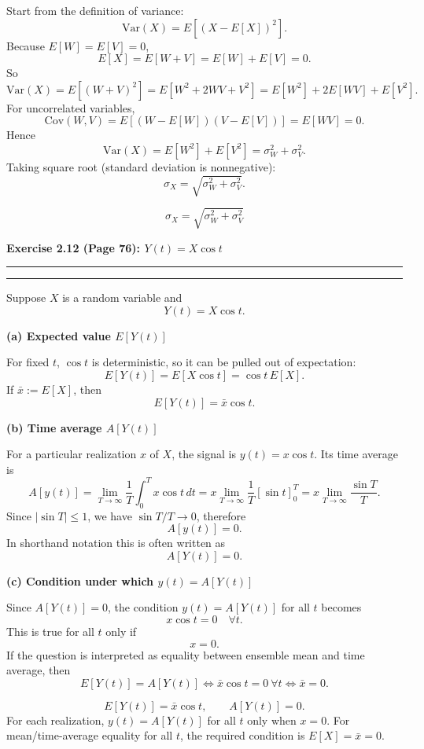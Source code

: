 \documentclass[12pt]{article}
\newcommand{\question}[1]{%
  \clearpage
  \vspace{0.5cm}
  {\noindent\normalsize \textbf{#1}}
  \vspace{0.2cm}
  \hrule
  \vspace{0.1cm}
  \hrule
  \vspace{0.3cm}
}
\begin{document}
\begin{stepbox}
Start from the definition of variance:
\[
\mathrm{Var}(X)=E[(X-E[X])^2].
\]
Because $E[W]=E[V]=0$,
\[
E[X]=E[W+V]=E[W]+E[V]=0.
\]
So
\[
\mathrm{Var}(X)=E[(W+V)^2]
=E[W^2+2WV+V^2]
=E[W^2]+2E[WV]+E[V^2].
\]
For uncorrelated variables,
\[
\mathrm{Cov}(W,V)=E[(W-E[W])(V-E[V])]=E[WV]=0.
\]
Hence
\[
\mathrm{Var}(X)=E[W^2]+E[V^2]
=\sigma_W^2+\sigma_V^2.
\]
Taking square root (standard deviation is nonnegative):
\[
\sigma_X=\sqrt{\sigma_W^2+\sigma_V^2}.
\]
\end{stepbox}

\begin{resultsbox}
\[
\boxed{\sigma_X = \sqrt{\sigma_W^2 + \sigma_V^2}}
\]
\end{resultsbox}

\question{Exercise 2.12 (Page 76): $Y(t)=X\cos t$}\label{ex:2.12}
Suppose $X$ is a random variable and
\[
Y(t)=X\cos t.
\]

\begin{stepbox}
\textbf{(a) Expected value $E[Y(t)]$}

For fixed $t$, $\cos t$ is deterministic, so it can be pulled out of expectation:
\[
E[Y(t)] = E[X\cos t] = \cos t\,E[X].
\]
If $\bar x := E[X]$, then
\[
E[Y(t)] = \bar x\cos t.
\]
\end{stepbox}

\begin{stepbox}
\textbf{(b) Time average $A[Y(t)]$}

For a particular realization $x$ of $X$, the signal is $y(t)=x\cos t$. Its time average is
\[
A[y(t)]
=\lim_{T\to\infty}\frac{1}{T}\int_0^T x\cos t\,dt
=x\lim_{T\to\infty}\frac{1}{T}\left[\sin t\right]_0^T
=x\lim_{T\to\infty}\frac{\sin T}{T}.
\]
Since $|\sin T|\le1$, we have $\sin T/T\to0$, therefore
\[
A[y(t)] = 0.
\]
In shorthand notation this is often written as
\[
A[Y(t)] = 0.
\]
\end{stepbox}

\begin{stepbox}
\textbf{(c) Condition under which $y(t)=A[Y(t)]$}

Since $A[Y(t)]=0$, the condition $y(t)=A[Y(t)]$ for all $t$ becomes
\[
x\cos t = 0 \quad \forall t.
\]
This is true for all $t$ only if
\[
x=0.
\]
If the question is interpreted as equality between ensemble mean and time average, then
\[
E[Y(t)] = A[Y(t)]
\iff \bar x\cos t = 0 \ \forall t
\iff \bar x=0.
\]
\end{stepbox}

\begin{resultsbox}
\[
E[Y(t)] = \bar x\cos t,
\qquad
A[Y(t)] = 0.
\]
For each realization, $y(t)=A[Y(t)]$ for all $t$ only when $x=0$. For mean/time-average equality for all $t$, the required condition is $E[X]=\bar x=0$.
\end{resultsbox}
\end{document}
